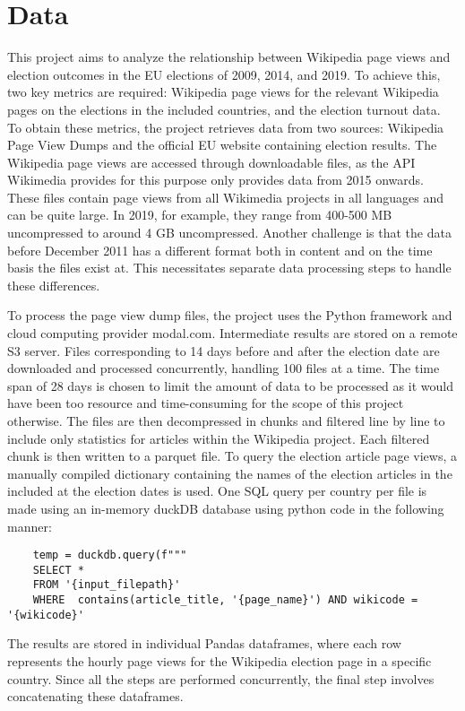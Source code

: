 \chapter{Data}
\label{sec:data}
This project aims to analyze the relationship between Wikipedia page views and election outcomes in the EU elections of 2009, 2014, and 2019. To achieve this, two key metrics are required: Wikipedia page views for the relevant Wikipedia pages on the elections in the included countries, and the election turnout data. To obtain these metrics, the project retrieves data from two sources: Wikipedia Page View Dumps and the official EU website containing election results. The Wikipedia page views are accessed through downloadable files, as the API Wikimedia provides for this purpose only provides data from 2015 onwards. These files contain page views from all Wikimedia projects in all languages and can be quite large. In 2019, for example, they range from 400-500 MB uncompressed to around 4 GB uncompressed. Another challenge is that the data before December 2011 has a different format both in content and on the time basis the files exist at. This necessitates separate data processing steps to handle these differences.

To process the page view dump files, the project uses the Python framework and cloud computing provider modal.com. Intermediate results are stored on a remote S3 server.  Files corresponding to 14 days before and after the election date are downloaded and processed concurrently, handling 100 files at a time. The time span of 28 days is chosen to limit the amount of data to be processed as it would have been too resource and time-consuming for the scope of this project otherwise. The files are then decompressed in chunks and filtered line by line to include only statistics for articles within the Wikipedia project. Each filtered chunk is then written to a parquet file. To query the election article page views, a manually compiled dictionary containing the names of the election articles in the included at the election dates is used. One SQL query per country per file is made using an in-memory duckDB database using python code in the following manner:

\begin{verbatim}
    temp = duckdb.query(f"""
    SELECT *
    FROM '{input_filepath}'
    WHERE  contains(article_title, '{page_name}') AND wikicode = '{wikicode}'
\end{verbatim}

The results are stored in individual Pandas dataframes, where each row represents the hourly page views for the Wikipedia election page in a specific country. Since all the steps are performed concurrently, the final step involves concatenating these dataframes.




